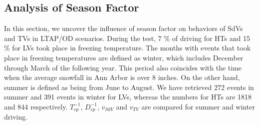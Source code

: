 \documentclass[letterpaper, 10 pt, conference]{ieeeconf}
\begin{document}
 \subsection{Analysis of Season Factor}
In this section, we uncover the influence of season factor on behaviors of SdVs and TVs in LTAP/OD scenarios. During the test, 7 $\%$ of driving for HTs \cite{JamesR.SayerScottE.BogardDillonFunkhouserDavidJ.LeBlancShanBaoAdamD.BlankespoorMaryLynnBuonarosa2010} and 15 $\%$ \cite{Sayer2010} for LVs took place in freezing temperature. The months with events that took place in freezing temperatures are defined as winter, which includes December through March of the following year. This period also coincides with the time when the average snowfall in Ann Arbor is over 8 inches. On the other hand, summer is defined as being from June to August. We have retrieved 272 events in summer and 391 events in winter for LVs, whereas the numbers for HTs are 1818 and 844 respectively. $T_{cp}^{-1}$, $D_{cp}^{-1}$, $v_{SdV}$ and $v_{TV}$  are compared for  summer and winter driving. 


\end{document}
